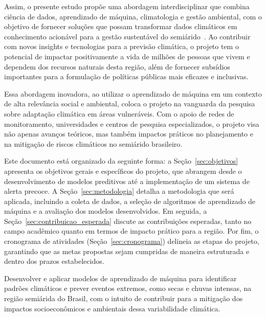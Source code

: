 \documentclass{projetodepesquisa} %
\begin{document}
	Assim, o presente estudo propõe uma abordagem interdisciplinar que combina ciência de dados, aprendizado de máquina, climatologia e gestão ambiental, com o objetivo de fornecer soluções que possam transformar dados climáticos em conhecimento acionável para a gestão sustentável do semiárido~\cite{melo2021}. Ao contribuir com novos insights e tecnologias para a previsão climática, o projeto tem o potencial de impactar positivamente a vida de milhões de pessoas que vivem e dependem dos recursos naturais desta região, além de fornecer subsídios importantes para a formulação de políticas públicas mais eficazes e inclusivas.
	
	Essa abordagem inovadora, ao utilizar o aprendizado de máquina em um contexto de alta relevância social e ambiental, coloca o projeto na vanguarda da pesquisa sobre adaptação climática em áreas vulneráveis. Com o apoio de redes de monitoramento, universidades e centros de pesquisa especializados, o projeto visa não apenas avanços teóricos, mas também impactos práticos no planejamento e na mitigação de riscos climáticos no semiárido brasileiro.

	Este documento está organizado da seguinte forma: a Seção~\ref{sec:objetivos} apresenta os objetivos gerais e específicos do projeto, que abrangem desde o desenvolvimento de modelos preditivos até a implementação de um sistema de alerta precoce. A Seção~\ref{sec:metodologia} detalha a metodologia que será aplicada, incluindo a coleta de dados, a seleção de algoritmos de aprendizado de máquina e a avaliação dos modelos desenvolvidos. Em seguida, a Seção~\ref{sec:contribuicao_esperada} discute as contribuições esperadas, tanto no campo acadêmico quanto em termos de impacto prático para a região. Por fim, o cronograma de atividades (Seção~\ref{sec:cronograma}) delineia as etapas do projeto, garantindo que as metas propostas sejam cumpridas de maneira estruturada e dentro dos prazos estabelecidos.
	
	\label{sec:objetivos}

	\label{sec:objetivo_geral}
	
	Desenvolver e aplicar modelos de aprendizado de máquina para identificar padrões climáticos e prever eventos extremos, como secas e chuvas intensas, na região semiárida do Brasil, com o intuito de contribuir para a mitigação dos impactos socioeconômicos e ambientais dessa variabilidade climática.
	
	\label{sec:objetivos_especificos}
	
\end{document}
